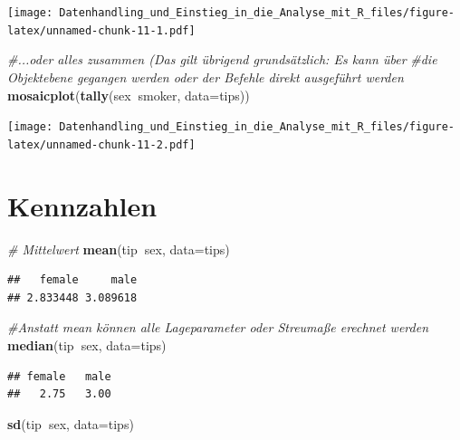\documentclass[10pt,ngerman,onside]{article}
\newenvironment{Shaded}{\begin{snugshade}}{\end{snugshade}}
\newcommand{\KeywordTok}[1]{\textcolor[rgb]{0.13,0.29,0.53}{\textbf{#1}}}
\newcommand{\DataTypeTok}[1]{\textcolor[rgb]{0.13,0.29,0.53}{#1}}
\newcommand{\CommentTok}[1]{\textcolor[rgb]{0.56,0.35,0.01}{\textit{#1}}}
\newcommand{\OperatorTok}[1]{\textcolor[rgb]{0.81,0.36,0.00}{\textbf{#1}}}
\newcommand{\NormalTok}[1]{#1}
\begin{document}
\texttt{[image: Datenhandling\_und\_Einstieg\_in\_die\_Analyse\_mit\_R\_files/figure-latex/unnamed-chunk-11-1.pdf]}

\begin{Shaded}
\begin{Highlighting}[]
\CommentTok{#...oder alles zusammen (Das gilt übrigend grundsätzlich: Es kann über }
\CommentTok{#die Objektebene gegangen werden oder der Befehle direkt ausgeführt werden}
\KeywordTok{mosaicplot}\NormalTok{(}\KeywordTok{tally}\NormalTok{(sex}\OperatorTok{~}\NormalTok{smoker, }\DataTypeTok{data=}\NormalTok{tips))}
\end{Highlighting}
\end{Shaded}

\texttt{[image: Datenhandling\_und\_Einstieg\_in\_die\_Analyse\_mit\_R\_files/figure-latex/unnamed-chunk-11-2.pdf]}

\hypertarget{kennzahlen}{%
\section{Kennzahlen}\label{kennzahlen}}

\begin{Shaded}
\begin{Highlighting}[]
\CommentTok{# Mittelwert}
\KeywordTok{mean}\NormalTok{(tip}\OperatorTok{~}\NormalTok{sex, }\DataTypeTok{data=}\NormalTok{tips)}
\end{Highlighting}
\end{Shaded}

\begin{verbatim}
##   female     male 
## 2.833448 3.089618
\end{verbatim}

\begin{Shaded}
\begin{Highlighting}[]
\CommentTok{#Anstatt mean können alle Lageparameter oder Streumaße erechnet werden }
\KeywordTok{median}\NormalTok{(tip}\OperatorTok{~}\NormalTok{sex, }\DataTypeTok{data=}\NormalTok{tips)}
\end{Highlighting}
\end{Shaded}

\begin{verbatim}
## female   male 
##   2.75   3.00
\end{verbatim}

\begin{Shaded}
\begin{Highlighting}[]
\KeywordTok{sd}\NormalTok{(tip}\OperatorTok{~}\NormalTok{sex, }\DataTypeTok{data=}\NormalTok{tips)}
\end{Highlighting}
\end{Shaded}
\end{document}
